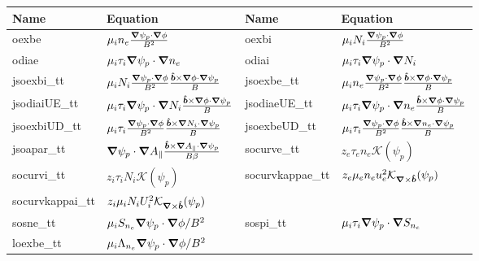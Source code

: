 \begin{longtable}{llll}
\toprule
\rowcolor{gray!50}\textbf{Name} &  \textbf{Equation}&
\textbf{Name} &  \textbf{Equation}\\
\midrule
    oexbe &$\mu_i n_e \frac{\vn\psi_p\cn\phi}{B^2}$ &
    oexbi &$\mu_i N_i \frac{\vn\psi_p\cn\phi}{B^2}$ \\
    odiae &$\mu_i \tau_i\vn\psi_p\cn n_e$ &
    odiai &$\mu_i \tau_i\vn\psi_p\cn N_i$ \\
    jsoexbi\_tt &$\mu_i N_i \frac{\vn\psi_p\cn\phi}{B^2} \frac{\bhat\times\vn\phi\cn \psi_p}{B}$ &
    jsoexbe\_tt &$\mu_i n_e \frac{\vn\psi_p\cn\phi}{B^2} \frac{\bhat\times\vn\phi\cn \psi_p}{B}$ \\
    jsodiaiUE\_tt &$\mu_i \tau_i\vn\psi_p\cn N_i \frac{\bhat\times\vn\phi\cn \psi_p}{B}$ &
    jsodiaeUE\_tt &$\mu_i \tau_i\vn\psi_p\cn n_e \frac{\bhat\times\vn\phi\cn \psi_p}{B}$ \\
    jsoexbiUD\_tt &$\mu_i\tau_i \frac{\vn\psi_p\cn\phi}{B^2} \frac{\bhat\times\vn N_i\cn \psi_p}{B}$ &
    jsoexbeUD\_tt &$\mu_i\tau_i \frac{\vn\psi_p\cn\phi}{B^2} \frac{\bhat\times\vn n_e\cn \psi_p}{B}$ \\
    jsoapar\_tt &$ \vn\psi_p\cn A_\parallel \frac{\bhat\times\vn A_\parallel\cn \psi_p}{B\beta}$ &
    socurve\_tt &$z_e\tau_e n_e \mathcal K(\psi_p)$ \\
    socurvi\_tt &$z_i\tau_i N_i \mathcal K(\psi_p)$ &
    socurvkappae\_tt &$z_e\mu_e n_eu_e^2 \mathcal K_{\vn\times\bhat}(\psi_p)$ \\
    socurvkappai\_tt &$z_i\mu_i N_iU_i^2 \mathcal K_{\vn\times\bhat}(\psi_p)$ & \\
    sosne\_tt & $\mu_i S_{n_e} \vn\psi_p\cn\phi/B^2$ &
    sospi\_tt & $\mu_i \tau_i \vn\psi_p \cn S_{n_e}$\\
    loexbe\_tt & $ \mu_i \Lambda_{n_e} \vn\psi_p\cn\phi/B^2$ & \\
\bottomrule
\end{longtable}


